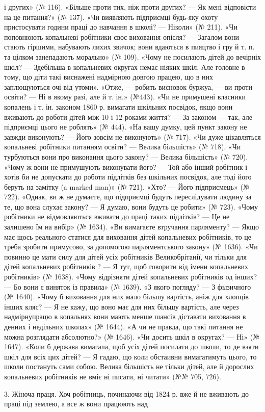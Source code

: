 \parcont{}  %
і других» (№ 116). «Більше проти тих, ніж проти других? — Як
мені відповісти на це питання?» (№ 137). «Чи виявляють підприємці
будь-яку охоту пристосувати години праці до навчання
в школі? — Ніколи» (№ 211). «Чи поповнюють копальневі
робітники своє виховання опісля? — Загалом вони стають гіршими,
набувають лихих звичок; вони вдаються в пияцтво і гру
й т. п. та цілком занепадають морально» (№ 109). «Чому не посилають
дітей до вечірніх шкіл? — Здебільша в копальневих округах
немає ніяких шкіл. Але головне в тому, що діти такі виснажені
надмірною довгою працею, що в них заплющуються очі від утоми».
«Отже, — робить висновок буржуа, — ви проти освіти? — Ні в
якому разі, але й т. ін.» (№443). «Чи не примушені власники
копалень і т. ін. законом 1860 р. вимагати шкільних посвідок,
якщо вони вживають до роботи дітей між 10 і 12 роками життя? —
За законом — так, але підприємці цього не роблять» (№ 444).
«На вашу думку, цей пункт закону не завжди виконують? —
Його зовсім не виконують» (№ 717). «Чи дуже цікавляться копальневі
робітники питанням освіти? — Велика більшість» (№ 718).
«Чи турбуються вони про виконання цього закону? — Велика
більшість» (№ 720). «Чому ж вони не примушують виконувати
його? — Той або інший робітник і хотів би не допускати до роботи
підлітків без шкільних посвідок, але тоді його беруть на замітку
(a marked man)» (№ 721). «Хто? — Його підприємець» (№ 722).
«Однак, ви ж не думаєте, що підприємці будуть переслідувати
людину за те, що вона слухає закону? — Я думаю, вони будуть
це робити» (№ 723). «Чому робітники не відмовляються вживати
до праці таких підлітків? — Це не залишено їм на вибір» (№ 1634).
«Ви вимагаєте втручання парляменту? — Якщо має щось реального
статися для виховання дітей копальневих робітників, то
це треба зробити примусово, за допомогою парляментського закону»
(№ 1636). «Чи повинно це мати силу для дітей усіх робітників
Великобрітанії, чи тільки для дітей копальневих робітників
? — Я тут, щоб говорити від імени копальневих робітників»
(№ 1638). «Чому відрізняти дітей копальневих робітників од
інших? — Бо вони є виняток із правила» (№ 1639). «З якого
погляду? — З фызичного (№ 1640). «Чому б виховання для них мало більшу вартість,
аніж для хлопців інших кляс? — Я не кажу, що воно має для них більшу вартість,
але через надмірнупрацю в копальнях вони мають менше шансів діставати
виховання в денних і недільних школах» (№ 1644). «А чи не правда, що такі
питання не можна розглядати абсолютно?» (№ 1646). «Чи досить шкіл в округах? —
Ні» (№ 1647). «Коли б держава вимагала, щоб усіх дітей посилати до школи, то де
взяти шкіл для всіх цих дітей? — Я гадаю, що коли обстаивни вимагатимуть цього,
то школи постануть сами собою. Велика більшість не тільки дітей, але й дорослих
копальневих робітників не вміє ні писати, ні читати» (№№ 705, 726).

3. Жіноча праця. Хоч робітниць, починаючи від 1824 р. вже
й не вживають до праці під землею, а все ж вони працюють над \parbreak{}  %
